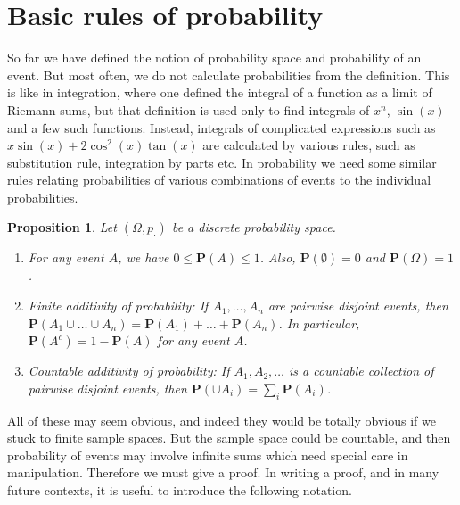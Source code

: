 \documentclass[preprint,  11pt]{amsart}
\theoremstyle{plain} %
\newtheorem{proposition}[theorem]{Proposition}
\theoremstyle{definition} %
\newtheorem{problem}[theorem]{Problem}
\begin{document}



\section{Basic rules of probability}
So far we have defined the notion of probability space and probability of an event. But most often, we do not calculate probabilities from the definition. This is like in integration, where one defined the integral of a function as a limit of Riemann sums, but that definition is used only to find integrals of $x^{n}$, $\sin(x)$ and a few such functions. Instead, integrals of complicated expressions such as $x\sin(x)+2\cos^{2}(x)\tan(x)$ are calculated by various rules, such as substitution rule, integration by parts etc. In probability we need some similar rules relating probabilities of various combinations of events to the individual probabilities.


\begin{proposition}\label{prop:basicrules} Let $(\Omega,p_{\cdot})$ be a discrete probability space. 
\begin{enumerate}\setlength\itemsep{6pt}
\item For any event $A$, we have $0\le \mathbf{P}(A)\le 1$. Also, $\mathbf{P}(\emptyset)=0$ and $\mathbf{P}(\Omega)=1$. 
\item {\em Finite additivity of probability:} If $A_{1},\ldots ,A_{n}$ are pairwise disjoint events, then $\mathbf{P}(A_{1}\cup \ldots \cup A_{n})=\mathbf{P}(A_{1})+\ldots +\mathbf{P}(A_{n})$.
In particular, $\mathbf{P}(A^{c})=1-\mathbf{P}(A)$ for any event $A$.
\item {\em Countable additivity of probability:} If $A_{1},A_{2},\ldots$ is a countable collection of pairwise disjoint events, then $\mathbf{P}(\cup A_{i})=\sum_{i}\mathbf{P}(A_{i})$.
\end{enumerate}
\end{proposition}
All of these may seem obvious, and indeed they would be totally obvious if we stuck to finite sample spaces. But the sample space could be countable, and then probability of events may involve infinite sums which need special care in manipulation. Therefore we must give a proof. In writing a proof, and in many future contexts, it is useful to introduce the following notation.
\end{document}
